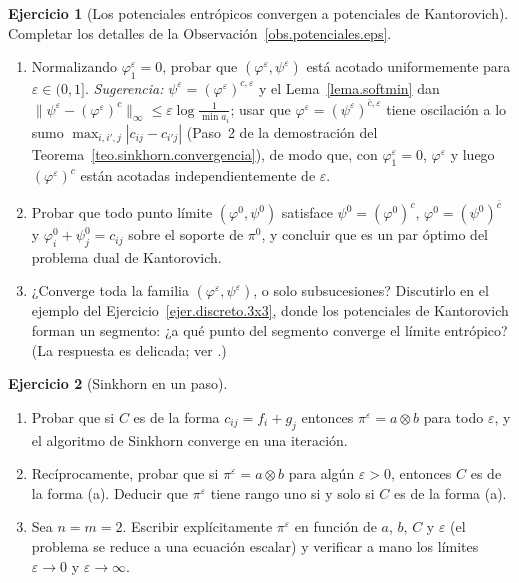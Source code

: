 \documentclass[12pt, a4paper]{amsbook}
\newcommand{\ve}{\varepsilon}
\theoremstyle{remark}
\theoremstyle{definition}
\newtheorem{ejercicio}{Ejercicio}[chapter]
\numberwithin{section}{chapter}
\numberwithin{subsection}{section}
\numberwithin{equation}{section}
\numberwithin{figure}{chapter}
\begin{document}
\begin{ejercicio}[Los potenciales entrópicos convergen a potenciales de Kantorovich]\label{ejer.potenciales.eps.limite}
Completar los detalles de la Observación~\ref{obs.potenciales.eps}.
\begin{enumerate}[label=(\alph*)]
\item Normalizando $\varphi^\ve_1=0$, probar que $(\varphi^\ve,\psi^\ve)$
está acotado uniformemente para $\ve\in(0,1]$. \emph{Sugerencia:}
$\psi^\ve=(\varphi^\ve)^{c,\ve}$ y el Lema~\ref{lema.softmin} dan
$\|\psi^\ve-(\varphi^\ve)^c\|_\infty\le\ve\log\frac1{\min a_i}$; usar que
$\varphi^\ve=(\psi^\ve)^{\bar c,\ve}$ tiene oscilación a lo sumo
$\max_{i,i',j}|c_{ij}-c_{i'j}|$ (Paso~2 de la demostración del
Teorema~\ref{teo.sinkhorn.convergencia}), de modo que, con
$\varphi^\ve_1=0$, $\varphi^\ve$ y luego $(\varphi^\ve)^c$ están acotadas
independientemente de $\ve$.
\item Probar que todo punto límite $(\varphi^0,\psi^0)$ satisface
$\psi^0=(\varphi^0)^c$, $\varphi^0=(\psi^0)^{\bar c}$ y
$\varphi^0_i+\psi^0_j=c_{ij}$ sobre el soporte de $\pi^0$, y concluir que es
un par óptimo del problema dual de Kantorovich.
\item ¿Converge toda la familia $(\varphi^\ve,\psi^\ve)$, o solo
subsucesiones? Discutirlo en el ejemplo del
Ejercicio~\ref{ejer.discreto.3x3}, donde los potenciales de Kantorovich
forman un segmento: ¿a qué punto del segmento converge el límite entrópico?
(La respuesta es delicada; ver \cite{Cominetti1994}.)
\end{enumerate}
\end{ejercicio}

\begin{ejercicio}[Sinkhorn en un paso]\label{ejer.sinkhorn.un.paso}
\leavevmode
\begin{enumerate}[label=(\alph*)]
\item Probar que si $C$ es de la forma $c_{ij}=f_i+g_j$ entonces
$\pi^\ve=a\otimes b$ para todo $\ve$, y el algoritmo de Sinkhorn converge en
una iteración.
\item Recíprocamente, probar que si $\pi^\ve=a\otimes b$ para algún
$\ve>0$, entonces $C$ es de la forma (a). Deducir que $\pi^\ve$ tiene rango
uno si y solo si $C$ es de la forma (a).
\item Sea $n=m=2$. Escribir explícitamente $\pi^\ve$ en función de $a$, $b$,
$C$ y $\ve$ (el problema se reduce a una ecuación escalar) y verificar a
mano los límites $\ve\to0$ y $\ve\to\infty$.
\end{enumerate}
\end{ejercicio}
\end{document}
